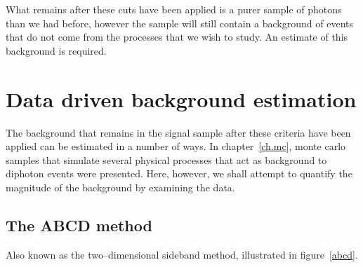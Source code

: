 What remains after these cuts have been applied is a purer sample of photons than we had before, however the sample will still contain a background of events that do not come from the processes that we wish to study. An estimate of this background is required.

\section{Data driven background estimation}
The background that remains in the signal sample after these criteria have been applied can be estimated in a number of ways. In chapter~\ref{ch.mc}, monte  carlo samples that simulate several physical processes that act as background to diphoton events were presented. Here, however, we shall attempt to quantify the magnitude of the background by examining the data.

\subsection{The ABCD method}
Also known as the two--dimensional sideband method, illustrated in figure~\ref{abcd}.

